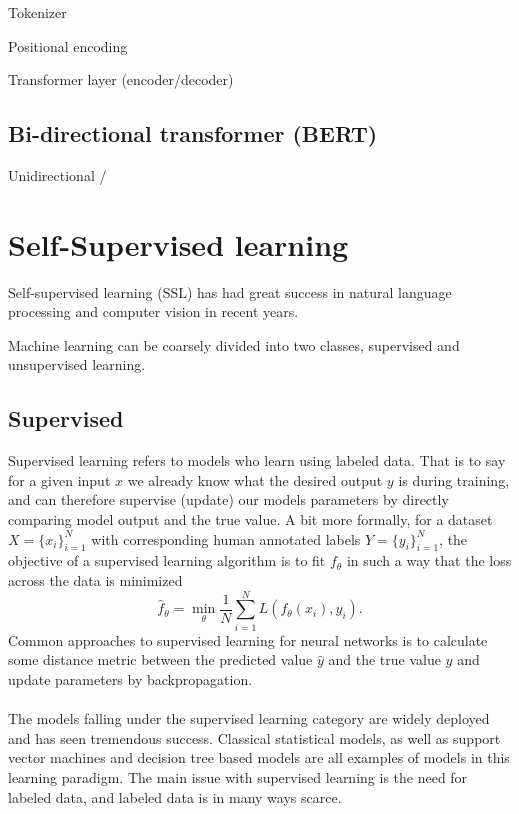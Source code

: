 \documentclass[../../thesis.tex]{subfiles}
\begin{document}
Tokenizer

Positional encoding


Transformer layer (encoder/decoder)

\subsection{Bi-directional transformer (BERT)}

Unidirectional / 



\section{Self-Supervised learning}

Self-supervised learning (SSL) has had great success in natural language processing and computer vision in recent years. 

Machine learning can be coarsely divided into two classes, supervised and unsupervised learning. 

\subsection{Supervised}
Supervised learning refers to models who learn using labeled data. That is to say for a given input $x$ we already know what the desired output $y$ is during training, and can therefore supervise (update) our models parameters by directly comparing model output and the true value. A bit more formally, for a dataset $X = \{x_i\}_{i=1}^N$ with corresponding human annotated labels $Y = \{y_i\}_{i=1}^N$, the objective of a supervised learning algorithm is to fit $f_\theta$ in such a way that the loss across the data is minimized
\begin{equation}
    \widehat{f}_\theta = \min_\theta \frac{1}{N} \sum_{i=1}^N L(f_\theta(x_i),y_i).
\end{equation}
Common approaches to supervised learning for neural networks is to calculate some distance metric between the predicted value $\widehat{y}$ and the true value $y$ and update parameters by backpropagation.\\\\
The models falling under the supervised learning category are widely deployed and has seen tremendous success. Classical statistical models, as well as support vector machines and decision tree based models are all examples of models in this learning paradigm. The main issue with supervised learning is the need for labeled data, and labeled data is in many ways scarce.
\end{document}
